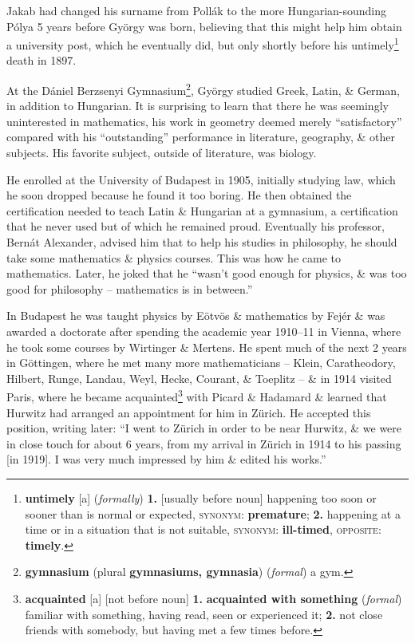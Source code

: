 \documentclass[oneside]{book}
\numberwithin{equation}{section}
\begin{document}
Jakab had changed his surname from Poll\'ak to the more Hungarian-sounding P\'olya 5 years before Gy\"orgy was born, believing that this might help him obtain a university post, which he eventually did, but only shortly before his untimely\footnote{\textbf{untimely} [a] (\textit{formally}) \textbf{1.} [usually before noun] happening too soon or sooner than is normal or expected, \textsc{synonym}: \textbf{premature}; \textbf{2.} happening at a time or in a situation that is not suitable, \textsc{synonym}: \textbf{ill-timed}, \textsc{opposite}: \textbf{timely}.} death in 1897.

At the D\'aniel Berzsenyi Gymnasium\footnote{\textbf{gymnasium} (plural \textbf{gymnasiums, gymnasia}) (\textit{formal}) a gym.}, Gy\"orgy studied Greek, Latin, \& German, in addition to Hungarian. It is surprising to learn that there he was seemingly uninterested in mathematics, his work in geometry deemed merely ``satisfactory'' compared with his ``outstanding'' performance in literature, geography, \& other subjects. His favorite subject, outside of literature, was biology.

He enrolled at the University of Budapest in 1905, initially studying law, which he soon dropped because he found it too boring. He then obtained the certification needed to teach Latin \& Hungarian at a gymnasium, a certification that he never used but of which he remained proud. Eventually his professor, Bern\'at Alexander, advised him that to help his studies in philosophy, he should take some mathematics \& physics courses. This was how he came to mathematics. Later, he joked that he ``wasn't good enough for physics, \& was too good for philosophy -- mathematics is in between.''

In Budapest he was taught physics by E\"otv\"os \& mathematics by Fej\'er \& was awarded a doctorate after spending the academic year 1910--11 in Vienna, where he took some courses by Wirtinger \& Mertens. He spent much of the next 2 years in G\"ottingen, where he met many more mathematicians -- Klein, Caratheodory, Hilbert, Runge, Landau, Weyl, Hecke, Courant, \& Toeplitz -- \& in 1914 visited Paris, where he became acquainted\footnote{\textbf{acquainted} [a] [not before noun] \textbf{1.} \textbf{acquainted with something} (\textit{formal}) familiar with something, having read, seen or experienced it; \textbf{2.} not close friends with somebody, but having met a few times before.} with Picard \& Hadamard \& learned that Hurwitz had arranged an appointment for him in Z\"urich. He accepted this position, writing later: ``I went to Z\"urich in order to be near Hurwitz, \& we were in close touch for about 6 years, from my arrival in Z\"urich in 1914 to his passing [in 1919]. I was very much impressed by him \& edited his works.''
\end{document}
